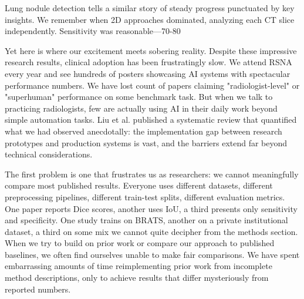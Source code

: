 \documentclass[12pt,a4paper]{article}
\begin{document}
Lung nodule detection tells a similar story of steady progress punctuated by key insights. We remember when 2D approaches dominated, analyzing each CT slice independently. Sensitivity was reasonable—70-80%

Yet here is where our excitement meets sobering reality. Despite these impressive research results, clinical adoption has been frustratingly slow. We attend RSNA every year and see hundreds of posters showcasing AI systems with spectacular performance numbers. We have lost count of papers claiming "radiologist-level" or "superhuman" performance on some benchmark task. But when we talk to practicing radiologists, few are actually using AI in their daily work beyond simple automation tasks. Liu et al. \cite{liu2019comparison} published a systematic review that quantified what we had observed anecdotally: the implementation gap between research prototypes and production systems is vast, and the barriers extend far beyond technical considerations.

The first problem is one that frustrates us as researchers: we cannot meaningfully compare most published results. Everyone uses different datasets, different preprocessing pipelines, different train-test splits, different evaluation metrics. One paper reports Dice scores, another uses IoU, a third presents only sensitivity and specificity. One study trains on BRATS, another on a private institutional dataset, a third on some mix we cannot quite decipher from the methods section. When we try to build on prior work or compare our approach to published baselines, we often find ourselves unable to make fair comparisons. We have spent embarrassing amounts of time reimplementing prior work from incomplete method descriptions, only to achieve results that differ mysteriously from reported numbers.
\end{document}
